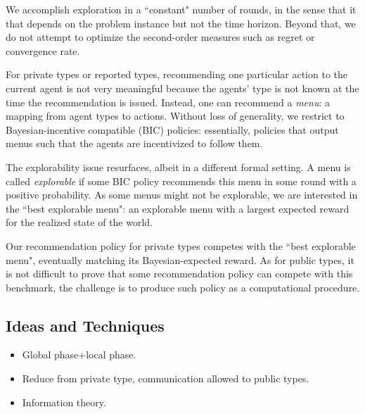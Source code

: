 We accomplish exploration in a ``constant" number of rounds, in the sense that it that depends on the problem instance but not the time horizon. Beyond that, we do not attempt to optimize the second-order measures such as regret or convergence rate.

For private types or reported types, recommending one particular action to the current agent is not very meaningful because the agents' type is not known at the time the recommendation is issued. Instead, one can recommend a \emph{menu}: a mapping from agent types to actions. Without loss of generality, we restrict to  Bayesian-incentive compatible (BIC) policies: essentially, policies that output menus such that the agents are incentivized to follow them.

The explorability issue resurfaces, albeit in a different formal setting. A menu is called \emph{explorable} if some BIC policy recommends this menu in some round with a positive probability. As some menus might not be explorable, we are interested in the ``best explorable menu": an explorable menu with a largest expected reward for the realized state of the world.

Our recommendation policy for private types competes with the ``best explorable menu", eventually matching its Bayesian-expected reward. As for public types, it is not difficult to prove that some recommendation policy can compete with this benchmark, the challenge is to produce such policy as a computational procedure.
 
 

\subsection{Ideas and Techniques}
\begin{itemize}
\item Global phase+local phase.
\item Reduce from private type, communication allowed to public types.
\item Information theory.
\end{itemize}

